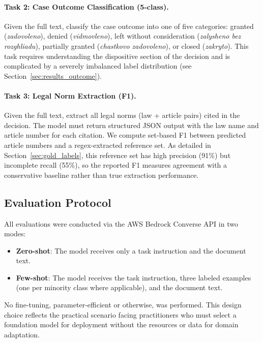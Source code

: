 \documentclass[11pt,a4paper]{article}
\begin{document}
\paragraph{Task 2: Case Outcome Classification (5-class).}
Given the full text, classify the case outcome into one of five categories: granted (\textit{zadovoleno}), denied (\textit{vidmovleno}), left without consideration (\textit{zalysheno bez rozghliadu}), partially granted (\textit{chastkovo zadovoleno}), or closed (\textit{zakryto}). This task requires understanding the dispositive section of the decision and is complicated by a severely imbalanced label distribution (see Section~\ref{sec:results_outcome}).

\paragraph{Task 3: Legal Norm Extraction (F1).}
Given the full text, extract all legal norms (law + article pairs) cited in the decision. The model must return structured JSON output with the law name and article number for each citation. We compute set-based F1 between predicted article numbers and a regex-extracted reference set. As detailed in Section~\ref{sec:gold_labels}, this reference set has high precision (91\%) but incomplete recall (55\%), so the reported F1 measures agreement with a conservative baseline rather than true extraction performance.

\subsection{Evaluation Protocol}
\label{sec:protocol}

All evaluations were conducted via the AWS Bedrock Converse API in two modes:

\begin{itemize}[leftmargin=*]
    \item \textbf{Zero-shot}: The model receives only a task instruction and the document text.
    \item \textbf{Few-shot}: The model receives the task instruction, three labeled examples (one per minority class where applicable), and the document text.
\end{itemize}

No fine-tuning, parameter-efficient or otherwise, was performed. This design choice reflects the practical scenario facing practitioners who must select a foundation model for deployment without the resources or data for domain adaptation.
\end{document}
